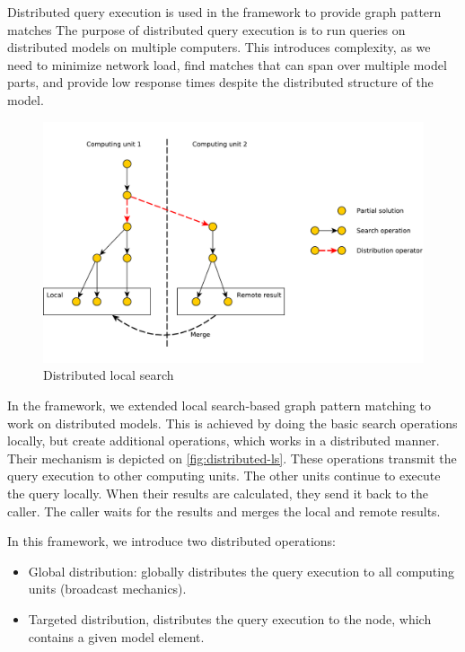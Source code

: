Distributed query execution is used in the framework to provide graph pattern matches
The purpose of distributed query execution is to run queries on distributed models on multiple computers. 
This introduces complexity, as we need to minimize network load, find matches that can span over multiple model parts, and provide low response times despite the distributed structure of the model.


\begin{figure}[h]
	\begin{center}
		\includegraphics[width=\textwidth]{figures/distributed-ls.pdf}
		\caption{Distributed local search}
		\label{fig:distributed-ls}
	\end{center}
\end{figure}

In the framework, we extended local search-based graph pattern matching to work on distributed models.
This is achieved by doing the basic search operations locally, but create additional operations, which works in a distributed manner. 
Their mechanism is depicted on \autoref{fig:distributed-ls}.
These operations transmit the query execution to other computing units.
The other units continue to execute the query locally. When their results are calculated, they send it back to the caller.
The caller waits for the results and merges the local and remote results.

In this framework, we introduce two distributed operations:
\begin{itemize}
	\item Global distribution: globally distributes the query execution to all computing units (broadcast mechanics).
	\item Targeted distribution, distributes the query execution to the node, which contains a given model element.
\end{itemize}

